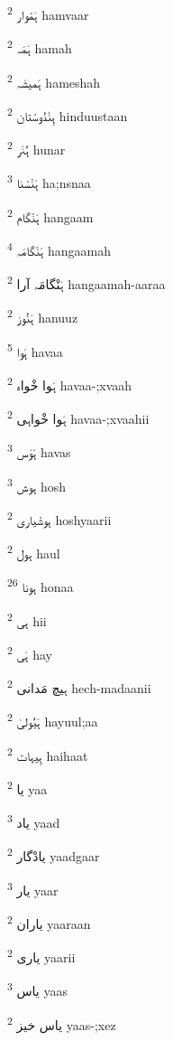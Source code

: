 \documentclass[12pt]{article}
\begin{document}
\begin{multicols}{5}
{\ur ہَمْوار}   \textsuperscript{2} hamvaar

{\ur ہَمَہ}   \textsuperscript{2} hamah

{\ur ہَمیشَہ}   \textsuperscript{2} hameshah

{\ur ہِنْدُوسْتان}   \textsuperscript{2} hinduustaan

{\ur ہُنَر}   \textsuperscript{2} hunar

{\ur ہَنْسْنا}   \textsuperscript{3} ha;nsnaa

{\ur ہَنْگام}   \textsuperscript{2} hangaam

{\ur ہَنْگامَہ}   \textsuperscript{4} hangaamah

{\ur ہَنْگامَہ آرا}   \textsuperscript{2} hangaamah-aaraa

{\ur ہَنُوز}   \textsuperscript{2} hanuuz

{\ur ہَوا}   \textsuperscript{5} havaa

{\ur ہَوا خْواہ}   \textsuperscript{2} havaa-;xvaah

{\ur ہَوا خْواہی}   \textsuperscript{2} havaa-;xvaahii

{\ur ہَوَس}   \textsuperscript{3} havas

{\ur ہوش}   \textsuperscript{3} hosh

{\ur ہوشْیاری}   \textsuperscript{2} hoshyaarii

{\ur ہول}   \textsuperscript{2} haul

{\ur ہونا}   \textsuperscript{26} honaa

{\ur ہی}   \textsuperscript{2} hii

{\ur ہَی}   \textsuperscript{2} hay

{\ur ہیچ مَدانی}   \textsuperscript{2} hech-madaanii

{\ur ہَیُولیٰ}   \textsuperscript{2} hayuul;aa

{\ur ہِیہات}   \textsuperscript{2} haihaat

{\ur یا}   \textsuperscript{2} yaa

{\ur یاد}   \textsuperscript{3} yaad

{\ur یادْگار}   \textsuperscript{2} yaadgaar

{\ur یار}   \textsuperscript{3} yaar

{\ur یاران}   \textsuperscript{2} yaaraan

{\ur یاری}   \textsuperscript{2} yaarii

{\ur یاس}   \textsuperscript{3} yaas

{\ur یاس خیز}   \textsuperscript{2} yaas-;xez


\end{multicols}
\end{document}
